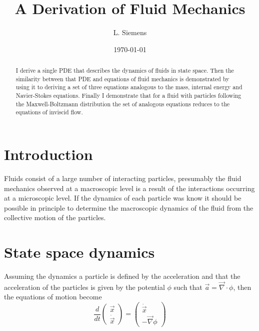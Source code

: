 \documentclass[%
 reprint,
 amsmath,amssymb,
 aps,
]{revtex4-1}
\newcommand{\dvec}[1]{\dot{\vec{#1}}}
\newcommand{\grad}{\vec{\nabla}}
\begin{document}
\title{A Derivation of Fluid Mechanics}%

\author{L. Siemens}

\date{\today}

\begin{abstract}
I derive a single PDE that describes the dynamics of fluids in state space. Then the similarity between that PDE and equations of fluid mechanics is demonstrated by using it to deriving a set of three equations analogous to the mass, internal energy and Navier-Stokes equations.  Finally I demonstrate that for a fluid with particles following the Maxwell-Boltzmann distribution the set of analogous equations reduces to the equations of inviscid flow.
\end{abstract}

\maketitle

\section{Introduction}

Fluids consist of a large number of interacting particles, presumably the fluid mechanics observed at a macroscopic level is a result of the interactions occurring at a microscopic level. If the dynamics of each particle was know it should be possible in principle to determine the macroscopic dynamics of the fluid from the collective motion of the particles. 

\section{State space dynamics}

Assuming the dynamics a particle is defined by the acceleration and that the acceleration of the particles is given by the potential $\phi$ such that $\vec{a} = \vec{\nabla}\cdot\phi$, then the equations of motion become
\[
\frac{d}{dt}\begin{pmatrix} \vec{x} \\ \dvec{x} \end{pmatrix}=\begin{pmatrix} \dvec{x} \\ -\grad\phi \end{pmatrix}
\]
\end{document}

